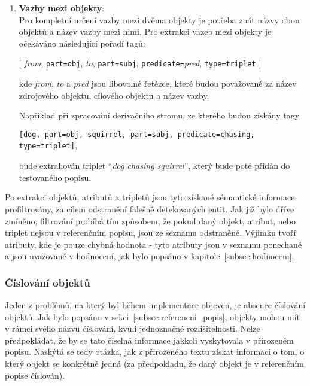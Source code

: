 \begin{enumerate}
	      Například při zpracování derivačního stromu, ze kterého budou získány tagy
	      \begin{center}
		      \texttt{[dog, part=obj, brown, color, part=attr, type=attribute]},
	      \end{center}
	      bude extrahován atribut \enquote{\emph{dog: color = brown}}, který bude poté přidán do testovaného popisu.
	\item \textbf{Vazby mezi objekty}:\\
	      Pro kompletní určení vazby mezi dvěma objekty je potřeba znát názvy obou objektů a název vazby mezi nimi.
	      Pro extrakci vazeb mezi objekty je očekáváno následující pořadí tagů:
	      \begin{center}
		      $\bigl[ $ \emph{from}, \texttt{part=obj}, \emph{to},
					      {\texttt{part=subj}}, \texttt{predicate=}\emph{pred}, {\texttt{type=triplet}} $\bigr]$
	      \end{center}
	      kde \emph{from}, \emph{to} a \emph{pred} jsou libovolné řetězce, které budou považované za název
	      zdrojového objektu, cílového objektu a název vazby.

	      Například při zpracování derivačního stromu, ze kterého budou získány tagy
	      \begin{center}
		      \texttt{[dog, part=obj, squirrel, part=subj, predicate=chasing, type=triplet]},
	      \end{center}
	      bude extrahován triplet \enquote{\emph{dog chasing squirrel}}, který bude poté přidán do testovaného popisu.
\end{enumerate}

Po extrakci objektů, atributů a tripletů jsou tyto získané sémantické informace profiltrovány,
za cílem odstranění falešně detekovaných entit.
Jak již bylo dříve zmíněno, filtrování probíhá tím způsobem, že pokud daný objekt, atribut,
nebo triplet nejsou v referenčním popisu, jsou ze seznamu odstraněné.
Výjimku tvoří atributy, kde je pouze chybná hodnota - tyto atributy jsou v seznamu ponechané a jsou uvažované v hodnocení,
jak bylo popsáno v kapitole~\ref{subsec:hodnoceni}.

\subsubsection{Číslování objektů}\label{subsubsec:cislovani_objektu}
Jeden z problémů, na který byl během implementace objeven, je absence číslování objektů.
Jak bylo popsáno v sekci~\ref{subsec:referencni_popis}, objekty mohou mít v rámci svého názvu číslování, kvůli jednoznačné rozlišitelnosti.
Nelze předpokládat, že by se tato číselná informace jakkoli vyskytovala v přirozeném popisu.
Naskýtá se tedy otázka, jak z přirozeného textu získat informaci o tom, o který objekt se konkrétně jedná
(za předpokladu, že daný objekt je v referenčním popise číslován).

